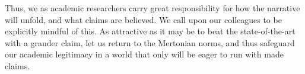 \documentclass{article}
\theoremstyle{plain}
\theoremstyle{definition}
\theoremstyle{remark}
\begin{document}
Thus, we as academic researchers carry great responsibility for how the narrative will unfold, and what claims are believed. We call upon our colleagues to be explicitly mindful of this. As attractive as it may be to beat the state-of-the-art with a grander claim, let us return to the Mertonian norms, and thus safeguard our academic legitimacy in a world that only will be eager to run with made claims.






\end{document}
